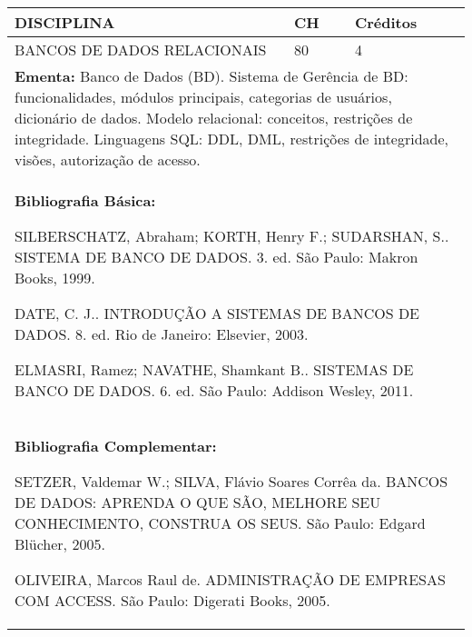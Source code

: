 \documentclass[a4paper, 12pt, openright, oneside, german, french, english, brazil]{abntex2}
\begin{document}
\begin{table}[!h]
  \footnotesize
  \centering
  \begin{tabular}{|p{100mm}|p{10mm}|p{20mm}|}
    \hline
    \textbf{DISCIPLINA} & \textbf{CH} & \textbf{Créditos} \\
    \hline
    BANCOS DE DADOS RELACIONAIS & 80 & 4 \\
    \hline
    \multicolumn{3}{|p{130mm}|}{\textbf{Ementa:}  Banco de Dados (BD). Sistema de Gerência de BD: funcionalidades, módulos principais, categorias de usuários, dicionário de dados. Modelo relacional: conceitos, restrições de integridade. Linguagens SQL: DDL, DML, restrições de integridade, visões, autorização de acesso.} \\
    \hline
    \multicolumn{3}{|p{130mm}|}{\textbf{Bibliografia Básica:}

    SILBERSCHATZ, Abraham; KORTH, Henry F.; SUDARSHAN, S.. SISTEMA DE BANCO DE DADOS. 3. ed. São Paulo: Makron Books, 1999.

DATE, C. J.. INTRODUÇÃO A SISTEMAS DE BANCOS DE DADOS. 8. ed. Rio de Janeiro: Elsevier, 2003.

ELMASRI, Ramez; NAVATHE, Shamkant B.. SISTEMAS DE BANCO DE DADOS. 6. ed. São Paulo: Addison Wesley, 2011.
} \\
    \hline
    \multicolumn{3}{|p{130mm}|}{\textbf{Bibliografia Complementar:}

    SETZER, Valdemar W.; SILVA, Flávio Soares Corrêa da. BANCOS DE DADOS: APRENDA O QUE SÃO, MELHORE SEU CONHECIMENTO, CONSTRUA OS SEUS. São Paulo: Edgard Blücher, 2005.

OLIVEIRA, Marcos Raul de. ADMINISTRAÇÃO DE EMPRESAS COM ACCESS. São Paulo: Digerati Books, 2005.
} \\
    \hline
  \end{tabular}
\end{table}
\end{document}
